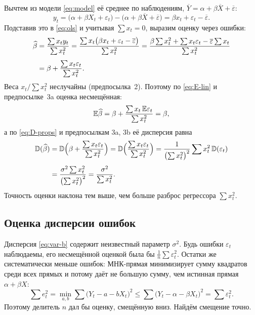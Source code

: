 Вычтем из модели \eqref{eq:model} её среднее по наблюдениям,
$\overline{Y} = \alpha + \beta\overline{X} + \overline{\varepsilon}$:
\begin{equation}
  y_t = \bigl(\alpha + \beta X_t + \varepsilon_t\bigr)
        - \bigl(\alpha + \beta\overline{X} + \overline{\varepsilon}\bigr)
      = \beta x_t + \varepsilon_t - \overline{\varepsilon}.
  \label{eq:y-dev}
\end{equation}
Подставив это в \eqref{eq:ols} и учитывая $\sum x_t = 0$, выразим оценку через
ошибки:
\begin{equation}
\begin{aligned}
  \widehat{\beta} &= \frac{\sum x_ty_t}{\sum x_t^2}
       = \frac{\sum x_t\bigl(\beta x_t + \varepsilon_t - \overline{\varepsilon}\bigr)}{\sum x_t^2}
       = \frac{\beta\sum x_t^2 + \sum x_t\varepsilon_t
               - \overline{\varepsilon}\sum x_t}{\sum x_t^2} \\[4pt]
      &= \beta + \frac{\sum x_t\varepsilon_t}{\sum x_t^2}.
\end{aligned}
\label{eq:bhat-eps}
\end{equation}
Веса $x_t/\sum x_t^2$ неслучайны (предпосылка~2). Поэтому по \eqref{eq:E-lin} и
предпосылке~3a оценка несмещённая:
\begin{equation}
  \mathbb{E}\widehat{\beta} = \beta + \frac{\sum x_t\,\mathbb{E}\varepsilon_t}{\sum x_t^2} = \beta,
  \label{eq:unbiased}
\end{equation}
а по \eqref{eq:D-props} и предпосылкам 3a, 3b её дисперсия равна
\begin{equation}
\begin{aligned}
  \mathbb{D}(\widehat{\beta}) &= \mathbb{D}\Bigl(\beta + \frac{\sum x_t\varepsilon_t}{\sum x_t^2}\Bigr)
           = \mathbb{D}\Bigl(\frac{\sum x_t\varepsilon_t}{\sum x_t^2}\Bigr)
           = \frac{1}{\bigl(\sum x_t^2\bigr)^2}\sum x_t^2\,\mathbb{D}(\varepsilon_t) \\[4pt]
          &= \frac{\sigma^2\sum x_t^2}{\bigl(\sum x_t^2\bigr)^2}
           = \frac{\sigma^2}{\sum x_t^2}.
\end{aligned}
\label{eq:var-b}
\end{equation}
Точность оценки наклона тем выше, чем больше разброс регрессора $\sum x_t^2$.

\subsection{Оценка дисперсии ошибок}\label{sec:s2}

Дисперсия \eqref{eq:var-b} содержит неизвестный параметр $\sigma^2$. Будь ошибки
$\varepsilon_t$ наблюдаемы, его несмещённой оценкой была бы
$\frac{1}{n}\sum\varepsilon_t^2$. Остатки же систематически меньше ошибок:
МНК-прямая минимизирует сумму квадратов среди всех прямых и потому даёт не
большую сумму, чем истинная прямая $\alpha + \beta X$:
\[
  \sum e_t^2 = \min_{a,b}\sum\bigl(Y_t - a - bX_t\bigr)^2
  \le \sum\bigl(Y_t - \alpha - \beta X_t\bigr)^2 = \sum\varepsilon_t^2 .
\]
Поэтому делитель $n$ дал бы оценку, смещённую вниз. Найдём смещение точно.

